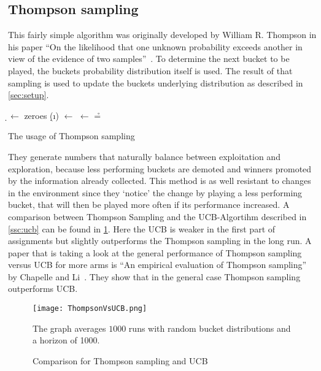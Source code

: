 \documentclass[main.tex]{subfiles}
\begin{document}
\subsection{Thompson sampling}\label{ssc:thompson}
This fairly simple algorithm was originally developed by William R. Thompson in his paper ``On the likelihood that one unknown probability exceeds another in view of the evidence of two samples''~\cite{thompson1933likelihood}. To determine the next bucket to be played, the buckets probability distribution itself is used. The result of that sampling is used to update the buckets underlying distribution as described in \ref{sec:setup}.

\begin{algorithm}
\KwIn{\b}
\BlankLine
\d $\leftarrow$ zeroes \;
{
\d(\i) $\leftarrow$ \draw{\b{\i}}
}
\nb $\leftarrow$ \max{\d} \;
\r = \rw{\nb}\;

\caption[Thompson sampling]{The usage of Thompson sampling}
\label{alg:ThompsonSampling}
\end{algorithm}

They generate numbers that naturally balance between exploitation and exploration, because less performing buckets are demoted and winners promoted by the information already collected. This method is as well resistant to changes in the environment since they `notice' the change by playing a less performing bucket, that will then be played more often if its performance increased. A comparison between Thompson Sampling and the UCB-Algortihm described in \ref{ssc:ucb} can be found in \ref{fig:ThompsonVsUCB}. Here the UCB is weaker in the first part of assignments but slightly outperforms the Thompson sampling in the long run. A paper that is taking a look at the general performance of Thompson sampling versus UCB for more arms is ``An empirical evaluation of Thompson sampling'' by Chapelle and Li~\cite{chapelle2011empirical}. They show that in the general case Thompson sampling outperforms UCB.

\begin{figure}[ht]
\texttt{[image: ThompsonVsUCB.png]}
\centering
\caption{Comparison for Thompson sampling and UCB}
The graph averages $1000$ runs with random bucket distributions and a horizon of 1000.
\label{fig:ThompsonVsUCB}
\end{figure}
\end{document}

